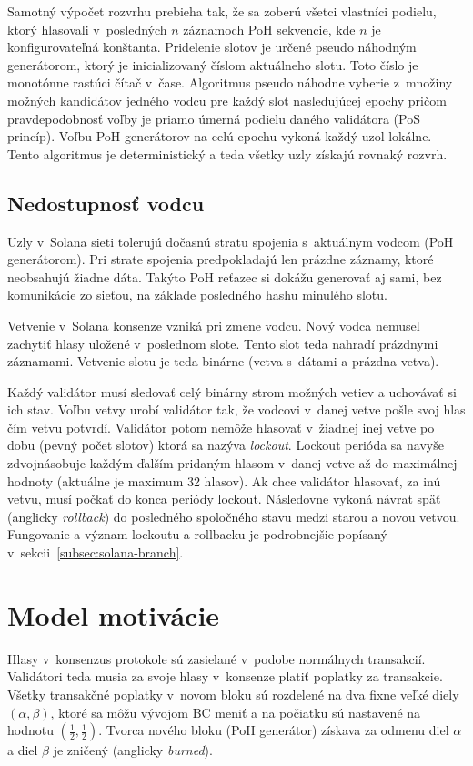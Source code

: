 Samotný výpočet rozvrhu prebieha tak, že sa zoberú všetci vlastníci podielu, ktorý hlasovali v~posledných $n$ záznamoch PoH sekvencie, kde $n$ je konfigurovateľná konštanta. Pridelenie slotov je určené pseudo náhodným generátorom, ktorý je inicializovaný číslom aktuálneho slotu. Toto číslo je monotónne rastúci čítač v~čase. Algoritmus pseudo náhodne vyberie z~množiny možných kandidátov jedného vodcu pre každý slot nasledujúcej epochy pričom pravdepodobnosť voľby je priamo úmerná podielu daného validátora (PoS princíp). Voľbu PoH generátorov na celú epochu vykoná každý uzol lokálne. Tento algoritmus je deterministický a teda všetky uzly získajú rovnaký rozvrh.

\subsection{Nedostupnosť vodcu}\label{subsec:solana-ldr-afk}
Uzly v~Solana sieti tolerujú dočasnú stratu spojenia s~aktuálnym vodcom (PoH generátorom). Pri strate spojenia predpokladajú len prázdne záznamy, ktoré neobsahujú žiadne dáta. Takýto PoH reťazec si dokážu generovať aj sami, bez komunikácie zo sieťou, na základe posledného hashu minulého slotu.

Vetvenie v~Solana konsenze vzniká pri zmene vodcu. Nový vodca nemusel zachytiť hlasy uložené v~poslednom slote. Tento slot teda nahradí prázdnymi záznamami. Vetvenie slotu je teda binárne (vetva s~dátami a prázdna vetva). 

Každý validátor musí sledovať celý binárny strom možných vetiev a uchovávať si ich stav. Voľbu vetvy urobí validátor tak, že vodcovi v~danej vetve pošle svoj hlas čím vetvu potvrdí. Validátor potom nemôže hlasovať v~žiadnej inej vetve po dobu (pevný počet slotov) ktorá sa nazýva \textit{lockout}. Lockout perióda sa navyše zdvojnásobuje každým ďalším pridaným hlasom v~danej vetve až do maximálnej hodnoty (aktuálne je maximum 32 hlasov). Ak chce validátor hlasovať, za inú vetvu, musí počkať do konca periódy lockout. Následovne vykoná návrat späť (anglicky \textit{rollback}) do posledného spoločného stavu medzi starou a novou vetvou. Fungovanie a význam lockoutu a rollbacku je podrobnejšie popísaný v~sekcii~\ref{subsec:solana-branch}.

\section{Model motivácie}\label{sec:solana-motiv}

Hlasy v~konsenzus protokole sú zasielané v~podobe normálnych transakcií. Validátori teda musia za svoje hlasy v~konsenze platiť poplatky za transakcie. Všetky transakčné poplatky v~novom bloku sú rozdelené na dva fixne veľké diely $(\alpha ,\beta)$, ktoré sa môžu vývojom BC meniť a na počiatku sú nastavené na hodnotu $(\frac{1}{2},\frac{1}{2})$. Tvorca nového bloku (PoH generátor) získava za odmenu diel $\alpha$ a diel $\beta$ je zničený (anglicky \textit{burned}).

